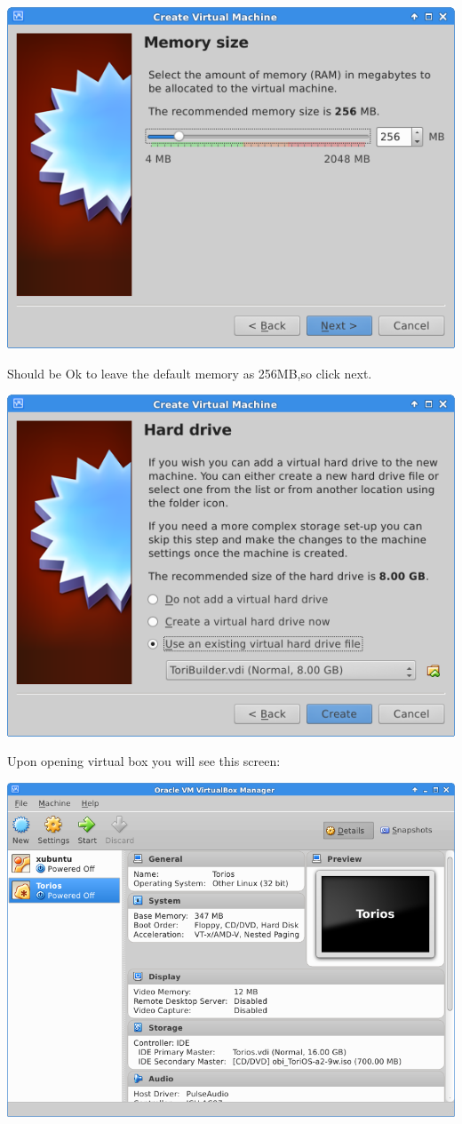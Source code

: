 \documentclass[12pt,a4paper]{book}
\begin{document}
\begin{center}
\includegraphics[width=0.7\linewidth]{ToriosTest02}
\end{center}

Should be Ok to leave the default memory as 256MB,so click next.

\begin{center}
\includegraphics[width=0.7\linewidth]{ToriosTest03}
\end{center}

Upon opening virtual box you will see this screen:
\begin{center}
\includegraphics[width=0.7\linewidth]{virtualbox}
\end{center}
\end{document}
